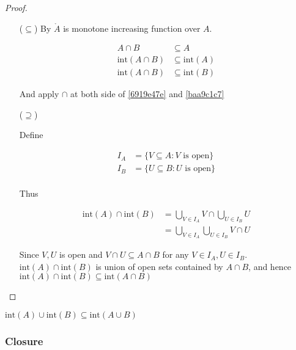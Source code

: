 \begin{proof}
    \:

   \begin{enumerate}
    \item [($\subseteq$)] By $\mathring{A}$ is monotone increasing function over $A$.
    
    \begin{align}
        A \cap B & \subseteq A \\
        \mathrm{int}(A \cap B) & \subseteq \mathrm{int}(A) \label{6919e47e} \\
        \mathrm{int}(A \cap B) & \subseteq \mathrm{int}(B) \label{baa9c1c7}
    \end{align}

    And apply $\cap$ at both side of \eqref{6919e47e} and \eqref{baa9c1c7}

    \item [($\supseteq$)]

    Define

    \begin{align*}
        I_A &= \{V \subseteq A: V \text{ is open} \} \\
        I_B &= \{U \subseteq B: U \text{ is open} \} \\
    \end{align*}

    Thus

    \begin{align*}
        \mathrm{int}(A) \cap \mathrm{int}(B) &= \bigcup_{V \in I_A} V \cap  \bigcup_{U \in I_B} U \\
        &=  \bigcup_{V \in I_A} \bigcup_{U \in I_B} V \cap U
    \end{align*}

    Since $V, U$ is open and $V \cap U \subseteq A \cap B$ for any $V \in I_A, U \in I_B$. $\mathrm{int}(A) \cap \mathrm{int}(B)$
    is union of open sets contained by $A \cap B$, and hence $\mathrm{int}(A) \cap \mathrm{int}(B) \subseteq \mathrm{int}(A \cap B)$
   \end{enumerate} 
\end{proof}

\begin{corollary}
    $\mathrm{int}(A) \cup \mathrm{int}(B) \subseteq \mathrm{int}(A \cup B)$
\end{corollary}

\subsubsection{Closure}

